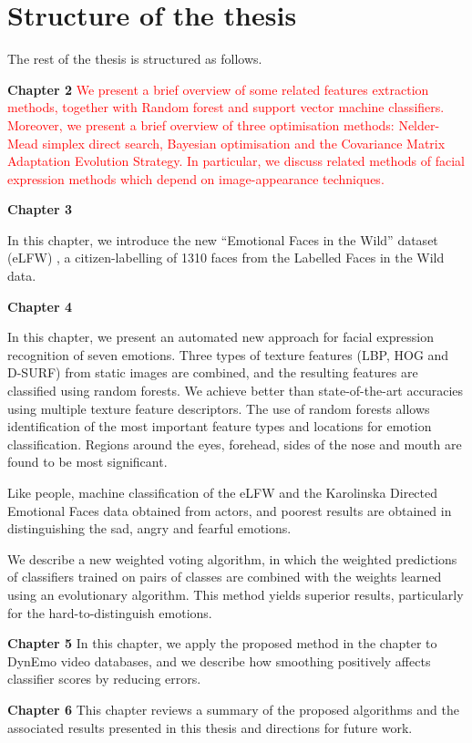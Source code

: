 \citep{abuhammad2018emotional}


\section{Structure of the thesis}
The rest of the thesis is structured as follows.

\textbf{Chapter 2} 
\textcolor{red}{
	We present a brief overview of some related features extraction methods, together with Random forest and support vector machine classifiers. Moreover, we present a brief overview of three optimisation methods: Nelder-Mead simplex direct search, Bayesian optimisation and the Covariance Matrix Adaptation Evolution Strategy. 
	In particular, we discuss related methods of facial expression methods which depend on image-appearance techniques.}

\textbf{Chapter 3}

In this chapter,  we introduce the new ``Emotional Faces in the Wild'' dataset (eLFW) \citep{LFWTech,LFWTechUpdate},  a citizen-labelling of 1310 faces from the Labelled Faces in the Wild data.  


\textbf{Chapter 4}

In this chapter,  we present an automated new approach for facial expression recognition of seven emotions.  Three types of texture features (LBP, HOG and D-SURF) from static images are combined, and the resulting features are classified using random forests.  We achieve better than state-of-the-art accuracies using multiple texture feature descriptors.  The use of random forests allows identification of the most important feature types and locations for emotion classification.  Regions around the eyes, forehead, sides of the nose and mouth are found to be most significant.

Like people, machine classification of the eLFW and the Karolinska Directed Emotional Faces data obtained from actors, and poorest results are obtained in distinguishing the sad, angry and fearful emotions.

We describe a new weighted voting algorithm, in which the weighted predictions of classifiers trained on pairs of classes are combined with the weights learned using an evolutionary algorithm.  This method yields superior results, particularly for the hard-to-distinguish emotions.

\textbf{Chapter 5} 
In this chapter,  we apply the proposed method in the chapter to DynEmo video databases, and we describe how smoothing positively affects classifier scores by reducing errors.  

\textbf{Chapter 6} 
This chapter reviews a summary of the proposed algorithms and the associated results presented in this thesis and directions for future work.